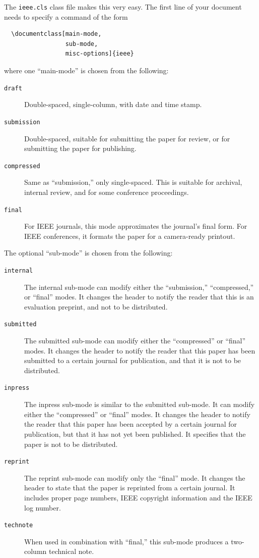 \documentclass[%
	final,
	notitlepage,
	narroweqnarray,
	inline,
	twoside,
	]{ieee}
\begin{document}
The \texttt{ieee.cls} class file makes this very easy.  The first line
of your document needs to specify a command of the form
\begin{verbatim}
  \documentclass[main-mode,
                 sub-mode,
                 misc-options]{ieee}
\end{verbatim}
where one ``main-mode'' is chosen from the following:
\begin{description}
\item[\texttt{draft}] Double-spaced, single-column, with date and time
     stamp.
\item[\texttt{submission}] Double-spaced, suitable for submitting the
     paper for review, or for submitting the paper for publishing.
\item[\texttt{compressed}] Same as ``submission,'' only single-spaced.
     This is suitable for archival, internal review, and for some 
     conference proceedings. 
\item[\texttt{final}] For IEEE journals, this mode approximates the
     journal's final form. For IEEE conferences, it formats
     the paper for a camera-ready printout.
\end{description}
The optional ``sub-mode'' is chosen from the following:
\begin{description}
\item[\texttt{internal}] The internal sub-mode can modify either the
    ``submission,'' 
    ``compressed,'' or ``final'' modes. It changes the header to notify 
    the reader that this is an evaluation preprint, and not to be
    distributed. 
\item[\texttt{submitted}] The submitted sub-mode can modify either the
    ``compressed'' or ``final'' modes. It changes the header to notify 
    the reader that this paper has been submitted to a certain journal 
    for publication, and that it is not to be distributed.
\item[\texttt{inpress}] The inpress sub-mode is similar to the submitted 
    sub-mode. It can modify either the ``compressed'' or ``final'' modes. 
    It changes the header to notify the 
    reader that this paper has been accepted by a certain journal for 
    publication, but that it has not yet been published. It specifies that 
    the paper is not to be distributed.
\item[\texttt{reprint}] The reprint sub-mode can modify only the ``final''
    mode. It changes the header to state that the paper is reprinted
    from a certain journal. It includes proper page numbers, IEEE
    copyright information and the IEEE log number.
\item[\texttt{technote}] When used in combination with ``final,''
    this sub-mode produces a two-column technical note.
\end{description}
\end{document}
